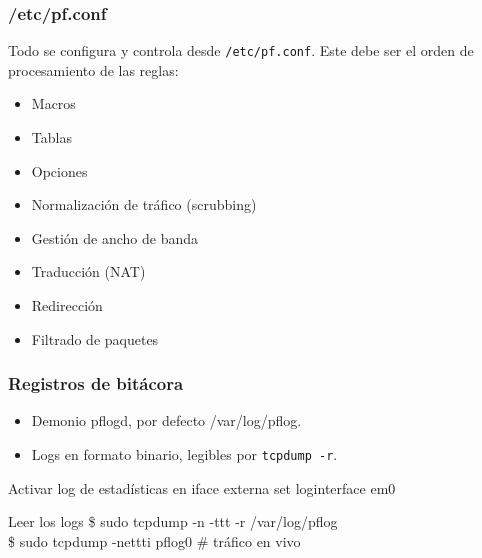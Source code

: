 \documentclass{beamer}
\begin{document}

\begin{frame}
\frametitle{/etc/pf.conf}

Todo se configura y controla desde \texttt{/etc/pf.conf}. Este debe ser el orden de procesamiento de las reglas:

\begin{itemize}
\item Macros
\item Tablas
\item Opciones
\item Normalización de tráfico (scrubbing)
\item Gestión de ancho de banda
\item Traducción (NAT)
\item Redirección
\item Filtrado de paquetes
\end{itemize}

\end{frame}


\begin{frame}
\frametitle{Registros de bitácora}

\begin{itemize}
\item Demonio pflogd, por defecto /var/log/pflog. 
\item Logs en formato binario, legibles por \texttt{tcpdump -r}.
\end{itemize}

\begin{block}{Activar log de estadísticas en iface externa}
set loginterface em0
\end{block}

\begin{block}{Leer los logs}
\$ sudo tcpdump -n -ttt -r /var/log/pflog \\
\$ sudo tcpdump -nettti pflog0  \hspace{4mm} \# tráfico en vivo 
\end{block}


\end{frame}

\end{document}
